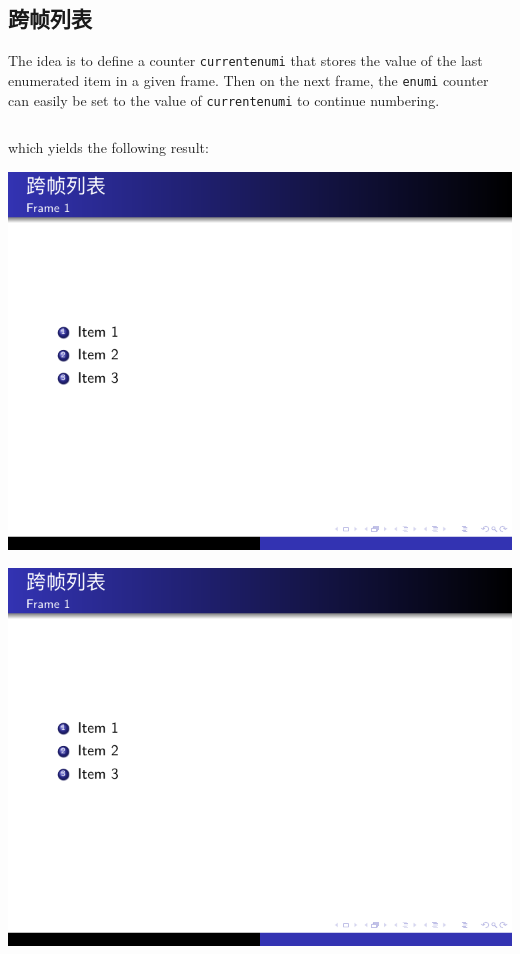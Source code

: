 \subsection{跨帧列表}

The idea is to define a counter \verb|currentenumi| that stores the value of the last enumerated item in a given frame. Then on the next frame, the \verb|enumi| counter can easily be set to the value of \verb|currentenumi| to continue numbering.

\inputminted[linenos=true]{latex}{examples/beamer/beamerlist04.tex}

which yields the following result:

\includegraphics[page=1]{examples/beamer/beamerlist04.pdf}

\includegraphics[page=2]{examples/beamer/beamerlist04.pdf}

